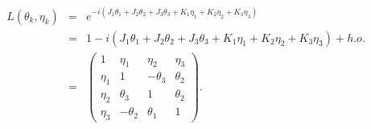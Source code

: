 \documentclass[11pt]{article}
\begin{document}
\begin{eqnarray}
    L(\theta_k,\eta_k)
    &=& e^{-i( J_1 \theta_1 + J_2 \theta_2 + J_3 \theta_3
            +K_1 \eta_1   + K_2 \eta_2   + K_3 \eta_3  )} \\
    &=& 1  -i( J_1 \theta_1 + J_2 \theta_2 + J_3 \theta_3
            +K_1 \eta_1   + K_2 \eta_2   + K_3 \eta_3 ) + h.o.\\
    &=& 
    \begin{pmatrix}
        1 & \eta_1 & \eta_2 & \eta_3 \\
        \eta_1 & 1 & -\theta_3 & \theta_2 \\
        \eta_2 & \theta_3 & 1 & \theta_2 \\
        \eta_3 & -\theta_2 & \theta_1 & 1
    \end{pmatrix}.     
  \end{eqnarray}
\end{document}
